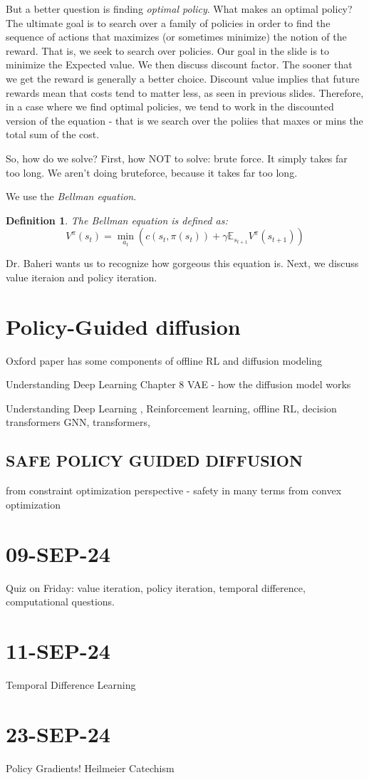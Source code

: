 \documentclass[10pt, oneside]{article}
\newtheorem{defn}{Definition}
\theoremstyle{definition}
\begin{document}
But a better question is finding \textit{optimal policy}. What makes an optimal policy? The ultimate goal is to search over a family of policies in order to find the sequence of actions that maximizes (or sometimes minimize) the notion of the reward. That is, we seek to search over policies. Our goal in the slide is to minimize the Expected value. We then discuss discount factor. The sooner that we get the reward is generally a better choice. Discount value implies that future rewards mean that costs tend to matter less, as seen in previous slides. Therefore, in a case where we find optimal policies, we tend to work in the discounted version of the equation - that is we search over the poliies that maxes or mins the total sum of the cost.

So, how do we solve?
First, how NOT to solve: brute force. It simply takes far too long. We aren't doing bruteforce, because it takes far too long. 

We use the \textit{Bellman equation}.
\begin{defn}
    The Bellman equation is defined as:
    \[V^{\pi}(s_t) = \min_{a_t}(c(s_t, \pi(s_t)) + \gamma \mathbb{E}_{s_{t+1}} V^\pi(s_{t+1}))\]
    
\end{defn}
Dr. Baheri wants us to recognize how gorgeous this equation is. Next, we discuss value iteraion and policy iteration.

\section{Policy-Guided diffusion}
Oxford paper has some components of offline RL and diffusion modeling 

Understanding Deep Learning Chapter 8 
VAE - how the diffusion model works 

Understanding Deep Learning , Reinforcement learning, offline RL, decision transformers GNN, transformers, 

\subsection{SAFE POLICY GUIDED DIFFUSION}
from constraint optimization perspective - safety in many terms from convex optimization

\section{09-SEP-24}
Quiz on Friday: value iteration, policy iteration, temporal difference, computational questions. 

\section{11-SEP-24}
Temporal Difference Learning

\section{23-SEP-24}
Policy Gradients!
Heilmeier Catechism
\end{document}
